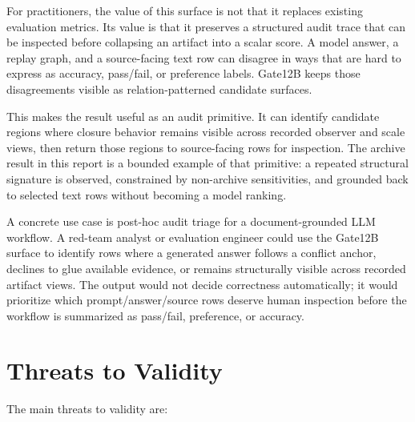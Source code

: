 \documentclass[11pt]{article}
\begin{document}
For practitioners, the value of this surface is not that it replaces existing
evaluation metrics. Its value is that it preserves a structured audit trace
that can be inspected before collapsing an artifact into a scalar score. A
model answer, a replay graph, and a source-facing text row can disagree in ways
that are hard to express as accuracy, pass/fail, or preference labels. Gate12B
keeps those disagreements visible as relation-patterned candidate surfaces.

This makes the result useful as an audit primitive. It can identify candidate
regions where closure behavior remains visible across recorded observer and
scale views, then return those regions to source-facing rows for inspection.
The archive result in this report is a bounded example of that primitive: a
repeated structural signature is observed, constrained by non-archive
sensitivities, and grounded back to selected text rows without becoming a model
ranking.

A concrete use case is post-hoc audit triage for a document-grounded LLM
workflow. A red-team analyst or evaluation engineer could use the Gate12B
surface to identify rows where a generated answer follows a conflict anchor,
declines to glue available evidence, or remains structurally visible across
recorded artifact views. The output would not decide correctness automatically;
it would prioritize which prompt/answer/source rows deserve human inspection
before the workflow is summarized as pass/fail, preference, or accuracy.

\section{Threats to Validity}
\label{sec:threats}

The main threats to validity are:
\end{document}
